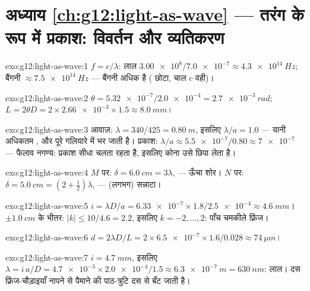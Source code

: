 \section*{अध्याय \ref{ch:g12:light-as-wave} --- तरंग के रूप में प्रकाश: विवर्तन और व्यतिकरण}

\begin{solution}{exo:g12:light-as-wave:1}
$f = c/\lambda$: लाल $\num{3.00e8}/\num{7.0e-7} \approx
\qty{4.3e14}{Hz}$; बैंगनी $\approx \qty{7.5e14}{Hz}$ --- बैंगनी अधिक है ( छोटा,
चाल $c$ वही)।
\end{solution}

\begin{solution}{exo:g12:light-as-wave:2}
$\theta = \num{5.32e-7}/\num{2.0e-4} = \qty{2.7e-3}{rad}$; $L = 2\theta D = 2 \times \num{2.66e-3} \times 1.5 \approx
\qty{8.0}{mm}$।
\end{solution}

\begin{solution}{exo:g12:light-as-wave:3}
आवाज़: $\lambda = 340/425 = \qty{0.80}{m}$, इसलिए $\lambda/a = 1.0$ --- यानी अधिकतम , और
 पूरे गलियारे में भर जाती है। प्रकाश: $\lambda/a \approx \num{5.5e-7}/0.80 \approx \num{7e-7}$ --- फैलाव नगण्य:
प्रकाश सीधा चलता रहता है, इसलिए कोना उसे छिपा लेता है।
\end{solution}

\begin{solution}{exo:g12:light-as-wave:4}
$M$ पर: $\delta = \qty{6.0}{cm} = 3\lambda$,  --- ऊँचा शोर। $N$ पर: $\delta = \qty{5.0}{cm} = (2 + \tfrac12)\lambda$,
 --- (लगभग) सन्नाटा।
\end{solution}

\begin{solution}{exo:g12:light-as-wave:5}
$i = \lambda D/a = \num{6.33e-7} \times 1.8/\num{2.5e-4} \approx
\qty{4.6}{mm}$। $\pm\qty{1.0}{cm}$ के भीतर: $|k| \leq 10/4.6 = 2.2$, इसलिए $k = -2, \dots, 2$: पाँच चमकीले फ़्रिंज।
\end{solution}

\begin{solution}{exo:g12:light-as-wave:6}
$d = 2\lambda D/L = 2 \times \num{6.5e-7} \times 1.6/0.028 \approx
\qty{74}{\micro m}$।
\end{solution}

\begin{solution}{exo:g12:light-as-wave:7}
$i = \qty{4.7}{mm}$, इसलिए $\lambda = i\,a/D = \num{4.7e-3} \times
\num{2.0e-4}/1.5 \approx \qty{6.3e-7}{m} = \qty{630}{nm}$: लाल। दस फ़्रिंज-चौड़ाइयाँ नापने से पैमाने की
पाठ-त्रुटि दस से बँट जाती है।
\end{solution}

